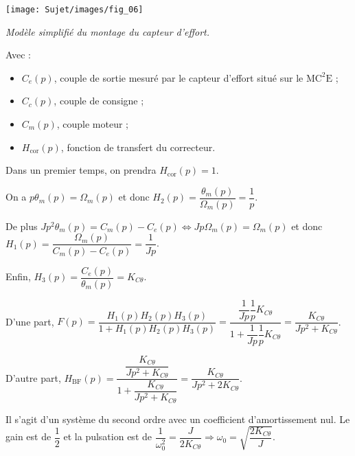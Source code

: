 \begin{multicols}{2}
\begin{center}
\texttt{[image: Sujet/images/fig\_06]}

\textit{Modèle simplifié du montage du capteur d’effort.}
\end{center}

Avec :
\begin{itemize}
\item $C_e(p)$, couple de sortie mesuré par le capteur d’effort situé sur le $\text{MC}^2\text{E}$ ;
\item $C_c(p)$, couple de consigne ;
\item $C_m(p)$, couple moteur ;
\item $H_{\text{cor}}(p)$, fonction de transfert du correcteur.
\end{itemize}
Dans un premier temps, on prendra $H_{\text{cor}}(p)=1$.

\fi
{}
\ifprof
\begin{corrige}
On a $p\theta_m(p)=\Omega_m(p)$ et donc $H_2(p)=\dfrac{\theta_m(p)}{\Omega_m(p)}=\dfrac{1}{p}$.

De plus $Jp^2 \theta_m(p) = C_m(p)-C_e(p) \Leftrightarrow Jp\Omega_m(p) = \Omega_m(p)$ et donc $H_1(p)=\dfrac{\Omega_m(p)}{C_m(p)-C_e(p)}=\dfrac{1}{Jp}$.

Enfin, $H_3(p)=\dfrac{C_e(p)}{\theta_m(p)}=K_{C\theta}$.

\end{corrige}
\else
\fi


\ifprof
\begin{corrige}
D'une part, $F(p)=\dfrac{H_1(p)H_2(p)H_3(p)}{1+H_1(p)H_2(p)H_3(p)} =\dfrac{\dfrac{1}{Jp}\dfrac{1}{p}K_{C\theta}}{1+\dfrac{1}{Jp}\dfrac{1}{p}K_{C\theta}} =\dfrac{K_{C\theta}}{Jp^2+K_{C\theta}}$.

D'autre part, $H_{\text{BF}}(p)
=\dfrac{\dfrac{K_{C\theta}}{Jp^2+K_{C\theta}}}{1+\dfrac{K_{C\theta}}{Jp^2+K_{C\theta}}}=\dfrac{K_{C\theta}}{Jp^2+2K_{C\theta}}$.

\end{corrige}
\else
\fi

\ifprof
\begin{corrige}
Il s'agit d'un système du second ordre avec un coefficient d'amortissement nul. Le gain est de $\dfrac{1}{2}$ et la pulsation est de $\dfrac{1}{\omega_0^2}=\dfrac{J}{2K_{C\theta}} \Rightarrow \omega_0=\sqrt{\dfrac{2K_{C\theta}}{J}}$.


\end{corrige}
\end{multicols}
